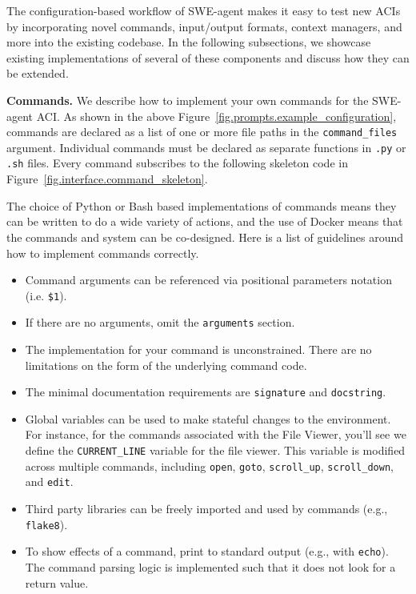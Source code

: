 The configuration-based workflow of SWE-agent makes it easy to test new ACIs by incorporating novel commands, input/output formats, context managers, and more into the existing codebase.
In the following subsections, we showcase existing implementations of several of these components and discuss how they can be extended.

\textbf{Commands.}
We describe how to implement your own commands for the SWE-agent ACI.
As shown in the above Figure~\ref{fig.prompts.example_configuration}, commands are declared as a list of one or more file paths in the \texttt{command\_files} argument.
Individual commands must be declared as separate functions in \texttt{.py} or \texttt{.sh} files.
Every command subscribes to the following skeleton code in Figure~\ref{fig.interface.command_skeleton}.



The choice of Python or Bash based implementations of commands means they can be written to do a wide variety of actions, and the use of Docker means that the commands and system can be co-designed.
Here is a list of guidelines around how to implement commands correctly.
\begin{itemize}[noitemsep]
    \item Command arguments can be referenced via positional parameters notation (i.e. \texttt{\$1}).
    \item If there are no arguments, omit the \texttt{arguments} section.
    \item The implementation for your command is unconstrained. There are no limitations on the form of the underlying command code.
    \item The minimal documentation requirements are \texttt{signature} and \texttt{docstring}.
    \item Global variables can be used to make stateful changes to the environment. For instance, for the commands associated with the File Viewer, you'll see we define the \texttt{CURRENT\_LINE} variable for the file viewer. This variable is modified across multiple commands, including \texttt{open}, \texttt{goto}, \texttt{scroll\_up}, \texttt{scroll\_down}, and \texttt{edit}.
    \item Third party libraries can be freely imported and used by commands (e.g., \texttt{flake8}).
    \item To show effects of a command, print to standard output (e.g., with \texttt{echo}). The command parsing logic is implemented such that it does not look for a return value.
\end{itemize}

